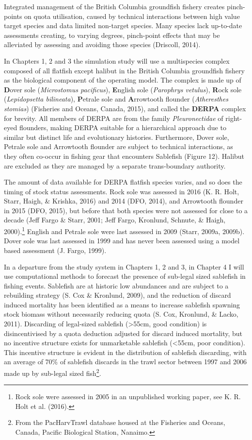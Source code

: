 \documentclass[12pt,]{scrartcl}
\begin{document}
Integrated management of the British Columbia groundfish fishery creates
pinch-points on quota utilisation, caused by technical interactions
between high value target species and data limited non-target species.
Many species lack up-to-date assessments creating, to varying degrees,
pinch-point effects that may be alleviated by assessing and avoiding
those species (Driscoll, 2014).

In Chapters 1, 2 and 3 the simulation study will use a multispecies
complex composed of all flatfish except halibut in the British Columbia
groundfish fishery as the biological component of the operating model.
The complex is made up of \textbf{D}over sole (\emph{Microstomus
pacificus}), \textbf{E}nglish sole (\emph{Parophrys vetulus}),
\textbf{R}ock sole (\emph{Lepidopsetta bilineata}), \textbf{P}etrale
sole and \textbf{A}rrowtooth flounder (\emph{Atheresthes stomias})
(Fisheries and Oceans, Canada, 2015), and called the \textbf{DERPA}
complex for brevity. All members of DERPA are from the family
\emph{Pleuronectidae} of right-eyed flounders, making DERPA suitable for
a hierarchical approach due to similar but distinct life and
evolutionary histories. Furthermore, Dover sole, Petrale sole and
Arrowtooth flounder are subject to technical interactions, as they often
co-occur in fishing gear that encounters Sablefish (Figure 12). Halibut
are excluded as they are managed by a separate trans-boundary authority.

The amount of data available for DERPA flatfish species varies, and so
does the timing of stock status assessments. Rock sole was assessed in
2016 (K. R. Holt, Starr, Haigh, \& Krishka, 2016) and 2014 (DFO, 2014),
and Arrowtooth flounder in 2015 (DFO, 2015), but before that both
species were not assessed for close to a decade (Jeff Fargo \& Starr,
2001; Jeff Fargo, Kronlund, Schnute, \& Haigh, 2000).\footnote{Rock sole
  were assessed in 2005 in an unpublished working paper, see K. R. Holt
  et al. (2016).} English and Petrale sole were last assessed in 2009
(Starr, 2009a, 2009b). Dover sole was last assessed in 1999 and has
never been assessed using a model based assessment (J. Fargo, 1999).

In a departure from the study system in Chapters 1, 2 and 3, in Chapter
4 I will use computational methods to forecast the presence of sub-legal
sized sablefish in fishing events. Sablefish are at historic low
abundances and are subject to a rebuilding strategy (S. Cox \& Kronlund,
2009), and the reduction of discard induced mortality has been
identified as a means to increase sablefish spawning stock biomass
without necessarily reducing quota (S. Cox, Kronlund, \& Lacko, 2011).
Discarding of legal-sized sablefish (\textgreater{}55cm, good condition)
is disincentivised by a quota deduction adjusted for discard induced
mortality, but no incentive structure exists for unmarketable sablefish
(\textless{}55cm, poor condition). This incentive structure is evident
in the distribution of sablefish discarding, with an average of 70\% of
sablefish discards in the trawl sector between 1997 and 2006 made up by
sub-legal sized fish\footnote{From the PacHarvTrawl database housed at
  the Fisheries and Oceans, Canada, Pacific Biological Station, Nanaimo.}.
\end{document}
